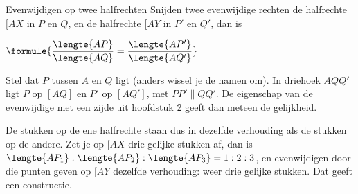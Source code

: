\begin{theorie}
\begin{minipage}[t]{.6\linewidth}
\vspace{0pt}
\begin{stelling}{Evenwijdigen op twee halfrechten}
Snijden twee evenwijdige rechten de halfrechte $[AX$ in $P$ en $Q$, en de halfrechte $[AY$ in $P'$ en $Q'$, dan is

\vspace{1mm}
\qquad $\formule{\dfrac{\lengte{AP}}{\lengte{AQ}} = \dfrac{\lengte{AP'}}{\lengte{AQ'}}}$
\end{stelling}

\begin{bewijs}
Stel dat $P$ tussen $A$ en $Q$ ligt (anders wissel je de namen om). In driehoek $AQQ'$ ligt $P$ op $[AQ]$ en $P'$ op $[AQ']$, met $PP' \parallel QQ'$. De eigenschap van de evenwijdige met een zijde uit hoofdstuk 2 geeft dan meteen de gelijkheid.
\end{bewijs}
\end{minipage}\hfill
\begin{minipage}[t]{.36\linewidth}
\vspace{0pt}
\centering
{}
\end{minipage}
\end{theorie}

De stukken op de ene halfrechte staan dus in dezelfde verhouding als de stukken op de andere. Zet je op $[AX$ drie gelijke stukken af, dan is $\lengte{AP_1} : \lengte{AP_2} : \lengte{AP_3} = 1 : 2 : 3$, en evenwijdigen door die punten geven op $[AY$ dezelfde verhouding: weer drie gelijke stukken. Dat geeft een constructie.

